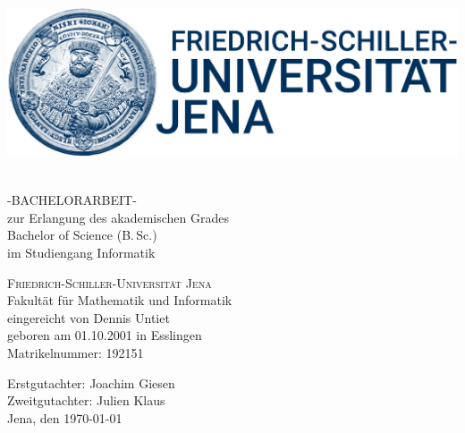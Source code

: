 \begin{titlepage}
\begin{center}
\includegraphics[scale=1]{Bilder/logo.png}\\[1.5cm]

\Huge\bfseries
\myTitle \\[1cm]
\mdseries

\Large
-BACHELORARBEIT- \\[0.25cm]
\large
zur Erlangung des akademischen Grades \\[0.25cm]
\Large
Bachelor of Science (B.\,Sc.) \\[0.25cm]
\large
im Studiengang Informatik

\vfill

\LARGE
\textsc{Friedrich-Schiller-Universität Jena} \\
\Large
Fakultät für Mathematik und Informatik \\
            
\vfill
\large
eingereicht von Dennis Untiet \\
geboren am 01.10.2001 in Esslingen \\
Matrikelnummer: 192151
            
\vfill
            
Erstgutachter: Joachim Giesen \\
Zweitgutachter: Julien Klaus \\
Jena, den \today
                
\end{center}
\end{titlepage}